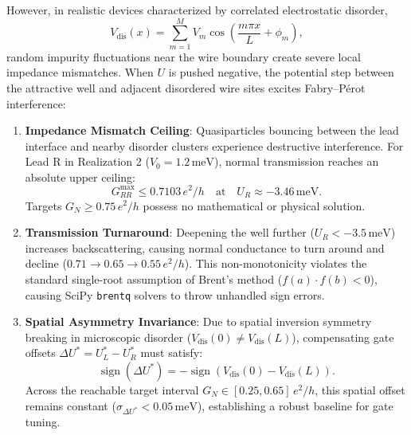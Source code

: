 \documentclass[aps,prb,reprint,superscriptaddress,showpacs,amsmath,amssymb]{revtex4-2}
\begin{document}
However, in realistic devices characterized by correlated electrostatic disorder,
\begin{equation}
V_{\mathrm{dis}}(x) = \sum_{m=1}^{M} V_m \cos\left( \frac{m \pi x}{L} + \phi_m \right),
\label{eq:fourier_disorder}
\end{equation}
random impurity fluctuations near the wire boundary create severe local impedance mismatches. When $U$ is pushed negative, the potential step between the attractive well and adjacent disordered wire sites excites Fabry--P\'erot interference:
\begin{enumerate}
    \item \textbf{Impedance Mismatch Ceiling}: Quasiparticles bouncing between the lead interface and nearby disorder clusters experience destructive interference. For Lead R in Realization 2 ($V_0 = 1.2\,\mathrm{meV}$), normal transmission reaches an absolute upper ceiling:
    \begin{equation}
    G_{RR}^{\mathrm{max}} \le 0.7103\,e^2/h \quad \text{at} \quad U_R \approx -3.46\,\mathrm{meV}.
    \label{eq:ceiling}
    \end{equation}
    Targets $G_N \ge 0.75\,e^2/h$ possess no mathematical or physical solution.
    \item \textbf{Transmission Turnaround}: Deepening the well further ($U_R < -3.5\,\mathrm{meV}$) increases backscattering, causing normal conductance to turn around and decline ($0.71 \to 0.65 \to 0.55\,e^2/h$). This non-monotonicity violates the standard single-root assumption of Brent's method ($f(a) \cdot f(b) < 0$), causing SciPy \texttt{brentq} solvers to throw unhandled sign errors.
    \item \textbf{Spatial Asymmetry Invariance}: Due to spatial inversion symmetry breaking in microscopic disorder ($V_{\mathrm{dis}}(0) \neq V_{\mathrm{dis}}(L)$), compensating gate offsets $\Delta U^* = U_L^* - U_R^*$ must satisfy:
    \begin{equation}
    \operatorname{sign}(\Delta U^*) = -\operatorname{sign}\left( V_{\mathrm{dis}}(0) - V_{\mathrm{dis}}(L) \right).
    \label{eq:asym_oppose}
    \end{equation}
    Across the reachable target interval $G_N \in [0.25, 0.65]\,e^2/h$, this spatial offset remains constant ($\sigma_{\Delta U^*} < 0.05\,\mathrm{meV}$), establishing a robust baseline for gate tuning.
\end{enumerate}
\end{document}
